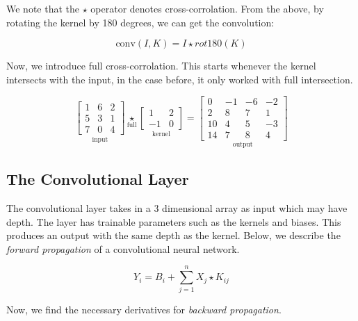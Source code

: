 \documentclass{article}
\begin{document}
\noindent We note that the $\star$ operator denotes cross-corrolation. From the above, by rotating the kernel 
by 180 degrees, we can get the convolution:

\begin{equation}
	\text{conv}(I, K) = I \star rot180(K)
	\label{eq:convolution}
\end{equation}

\noindent Now, we introduce full cross-corrolation. This starts whenever the kernel intersects with the input, 
in the case before, it only worked with full intersection.

\begin{equation}
	\underset{\text{input}}{
		\begin{bmatrix}
			1 & 6 & 2 \\
			5 & 3 & 1 \\
			7 & 0 & 4
	\end{bmatrix}} \underset{\text{full}}{\star}
	\underset{\text{kernel}}{
		\begin{bmatrix}
			1 & 2 \\
			-1 & 0
		\end{bmatrix}
	} = \underset{\text{output}}{
		\begin{bmatrix}
			0 & -1 & -6 & -2 \\
			2 & 8 & 7 & 1 \\
			10 & 4 & 5 & -3 \\
			14 & 7 & 8 & 4
		\end{bmatrix}
	}
	\label{eq:fullcrosscorrolation}
\end{equation}

\subsection{The Convolutional Layer}

The convolutional layer takes in a 3 dimensional array as input which may have depth. The layer has trainable parameters 
such as the kernels and biases. This produces an output with the same depth as the kernel. Below, we describe the 
\textit{forward propagation} of a convolutional neural network.

\begin{equation}
	Y_i = B_i + \displaystyle\sum_{j=1}^{n}X_j\star K_{ij}
	\label{eq:forwardpropagationoftheconvolutionallayer}
\end{equation}

\noindent Now, we find the necessary derivatives for \textit{backward propagation}.
\end{document}
